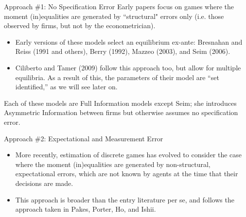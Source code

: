 \documentclass[xcolor=pdftex,dvipsnames,table,mathserif]{beamer}
\begin{document}
\begin{frame}{Approach \#1: No Specification Error}
\vspace{2mm}
Early papers focus on games where the moment (in)equalities are generated by ``structural" errors only (i.e. those observed by firms, but not by the econometrician).  
\begin{itemize}
\item Early versions of these models select an equilibrium ex-ante: Bresnahan and Reiss (1991 and others), Berry (1992), Mazzeo (2003), and Seim (2006).  
\item Ciliberto and Tamer (2009) follow this approach too, but allow for multiple equilibria.  As a result of this, the parameters of their model are ``set identified,'' as we will see later on.
\end{itemize}
Each of these models are Full Information models except Seim; she introduces Asymmetric Information between firms but otherwise assumes no specification error.\\
\end{frame}

\begin{frame}{Approach \#2: Expectational and Measurement Error}
\vspace{2mm}
\begin{itemize}
\item More recently, estimation of discrete games has evolved to consider the case where the moment (in)equalities are generated by non-structural, expectational errors, which are not known by agents at the time that their decisions are made.
\item This approach is broader than the entry literature per se, and follows the approach taken in Pakes, Porter, Ho, and Ishii. 
\end{itemize}
\end{frame}


\end{document}
